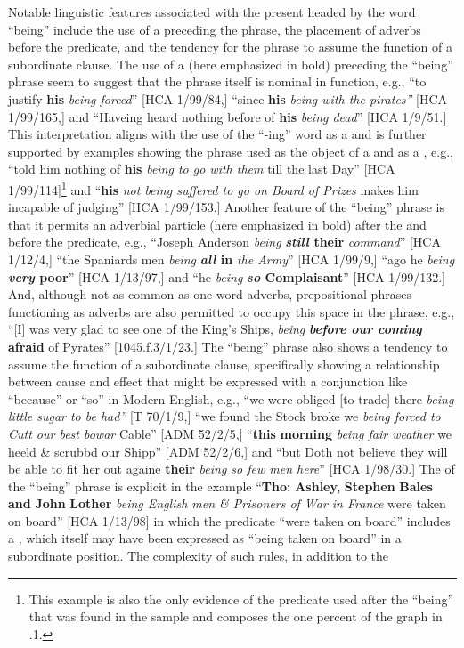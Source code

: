 Notable linguistic features associated with the present  headed by the word “being” include the use of a   preceding the phrase, the placement of adverbs before the predicate, and the tendency for the phrase to assume the function of a subordinate clause. The use of a   (here emphasized in bold) preceding the “being” phrase seem to suggest that the phrase itself is nominal in function, e.g., “to justify \textbf{his} \textit{being forced}” [HCA 1/99/84,] “since \textbf{his} \textit{being with the pirates”} [HCA 1/99/165,] and “Haveing heard nothing before of \textbf{his} \textit{being dead}” [HCA 1/9/51.] This interpretation aligns with the use of the “-ing” word as a  and is further supported by examples showing the phrase used as the object of a  and as a , e.g., “told him nothing of \textbf{his} \textit{being to go with them} till the last Day” [HCA 1/99/114]\footnote{This example is also the only evidence of the  predicate used after the  “being” that was found in the sample and composes the one percent of the graph in .1.}  and “\textbf{his} \textit{not being suffered to go on Board of Prizes} makes him incapable of judging” [HCA 1/99/153.]  Another feature of the “being” phrase is that it permits an adverbial particle (here emphasized in bold) after the  and before the predicate, e.g., “Joseph Anderson \textit{being} \textbf{\textit{still} their} \textit{command}” [HCA 1/12/4,] “the Spaniards men \textit{being} \textbf{\textit{all} in} \textit{the Army}” [HCA 1/99/9,] “ago he \textit{being} \textbf{\textit{very} poor}” [HCA 1/13/97,] and “he \textit{being} \textbf{\textit{so} Complaisant}” [HCA 1/99/132.] And, although not as common as one word adverbs, prepositional phrases functioning as adverbs are also permitted to occupy this space in the phrase, e.g., “[I] was very glad to see one of the King’s Ships, \textit{being} \textbf{\textit{before our coming} afraid} of Pyrates” [1045.f.3/1/23.] The “being” phrase also shows a tendency to assume the function of a subordinate clause, specifically showing a relationship between cause and effect that might be expressed with a conjunction like “because” or “so” in Modern English, e.g., “we were obliged [to trade] there \textit{being little sugar to be had”} [T 70/1/9,] “we found the Stock broke we \textit{being forced to Cutt our best bowar} Cable” [ADM 52/2/5,] “\textbf{this} \textbf{morning} \textit{being fair weather} we heeld \& scrubbd our Shipp” [ADM 52/2/6,] and “but Doth not believe they will be able to fit her out againe \textbf{their} \textit{being so few men here}” [HCA 1/98/30.] The  of the “being” phrase is explicit in the example “\textbf{Tho:} \textbf{Ashley,} \textbf{Stephen} \textbf{Bales} \textbf{and} \textbf{John} \textbf{Lother} \textit{being English men \& Prisoners of War in France} were taken on board” [HCA 1/13/98] in which the  predicate “were taken on board” includes a , which itself may have been expressed as “being taken on board” in a subordinate position. The complexity of such  rules, in addition to the 